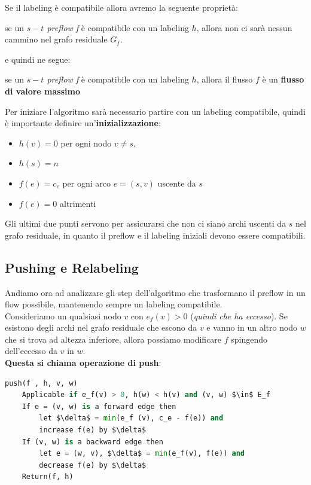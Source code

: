 Se il labeling è compatibile allora avremo la seguente proprietà:
\begin{myblockquote}
      se un \textit{$s-t$ preflow f} è compatibile con un labeling $h$, allora non
      ci sarà nessun cammino nel grafo residuale $G_f$.
\end{myblockquote}

e quindi ne segue:
\begin{myblockquote}
      se un \textit{$s-t$ preflow f} è compatibile con un labeling $h$, allora il
      flusso $f$ è un \textbf{flusso di valore massimo}
\end{myblockquote}

Per iniziare l'algoritmo sarà necessario partire con un labeling compatibile,
quindi è importante definire un'\textbf{inizializzazione}:

\begin{itemize}
      \item $h(v) = 0$ per ogni nodo $v \neq s$,
      \item $h(s) = n$
      \item $f(e) = c_e$ per ogni arco $e = (s,v)$ uscente da $s$
      \item $f(e) = 0$ altrimenti
\end{itemize}

Gli ultimi due punti servono per assicurarsi che non ci siano archi uscenti da
$s$ nel grafo residuale, in quanto il preflow e il labeling iniziali devono
essere compatibili.

\subsection{Pushing e Relabeling}
Andiamo ora ad analizzare gli step dell'algoritmo che trasformano il preflow in
un flow possibile, mantenendo sempre un labeling compatibile.\\

Consideriamo un qualsiasi nodo $v$ con $e_f(v)>0$ (\textit{quindi che ha
      eccesso}). Se esistono degli archi nel grafo residuale che escono da $v$ e vanno
in un altro nodo $w$ che si trova ad altezza inferiore, allora possiamo
modificare $f$ spingendo dell'eccesso da $v$ in $w$.\\

\textbf{Questa si chiama operazione di push}:

\begin{lstlisting}[language=Python, mathescape=true]
push(f , h, v, w)
    Applicable if e_f(v) > 0, h(w) < h(v) and (v, w) $\in$ E_f
    If e = (v, w) is a forward edge then
        let $\delta$ = min(e_f (v), c_e - f(e)) and 
        increase f(e) by $\delta$
    If (v, w) is a backward edge then
        let e = (w, v), $\delta$ = min(e_f(v), f(e)) and
        decrease f(e) by $\delta$
    Return(f, h)
\end{lstlisting}

